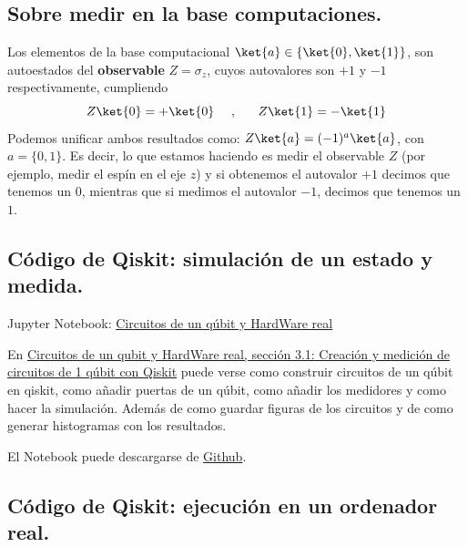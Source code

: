 \documentclass[a4paper,11pt]{book} %
\numberwithin{equation}{chapter}
\begin{document}
		\subsection{Sobre medir en la base computaciones.}

Los elementos de la base computacional $\ket{a}\in \{\ket{0},\ket{1}\}$, son autoestados del \textbf{observable} $Z = \sigma_z $, cuyos autovalores son $+1$ y $-1$ respectivamente, cumpliendo
\begin{equation}
Z\ket{0} = +\ket{0}~~~~,~~~~~ Z\ket{1} = -\ket{1}
\end{equation} 
Podemos unificar ambos resultados como: $Z\ket{a} = (-1)^a\ket{a}$, con  $a=\{0,1\}$. Es decir, lo que estamos haciendo es medir el observable $Z$ (por ejemplo, medir el espín en el eje $z$) y si obtenemos el autovalor $+1$ decimos que tenemos un 0, mientras que si medimos el autovalor $-1$, decimos que tenemos un $1$. 


		\subsection{Código de Qiskit: simulación de un estado y medida.}  \label{sec_medidas_subsub_codigo}

	\begin{mybox_orange}{Jupyter Notebook: \href{https://www.scbi.uma.es/web/wp-content/uploads/Jupyterbook/CICC_UMA/Notebooks/html/docs/Part_01/Chapter_03-Circuitos_1_qubit_medidas_y_RealHardware_myst.html}{Circuitos de un qúbit y HardWare real}}
	
	En \href{https://www.scbi.uma.es/web/wp-content/uploads/Jupyterbook/CICC_UMA/Notebooks/html/docs/Part_01/Chapter_03-Circuitos_1_qubit_medidas_y_RealHardware_myst.html#creacion-y-medicion-de-circuitos-de-1-qubit-con-qiskit}{Circuitos de un qubit y HardWare real, sección 3.1: Creación y medición de circuitos de 1 qúbit con Qiskit}
	puede verse como construir circuitos de un qúbit en qiskit, como añadir puertas de un qúbit, como añadir los medidores y como hacer la simulación. Además de como guardar figuras de los circuitos y de como generar histogramas con los resultados.
	
	El Notebook puede descargarse de \href{https://github.com/davidcb98/CICC_UMA/blob/master/Notebooks/Part_01/Chapter_03-Circuitos_1_qubit_medidas_y_RealHardware.ipynb}{Github}.
	\end{mybox_orange}
	
		\subsection{Código de Qiskit: ejecución en un ordenador real.}
		
\end{document}
